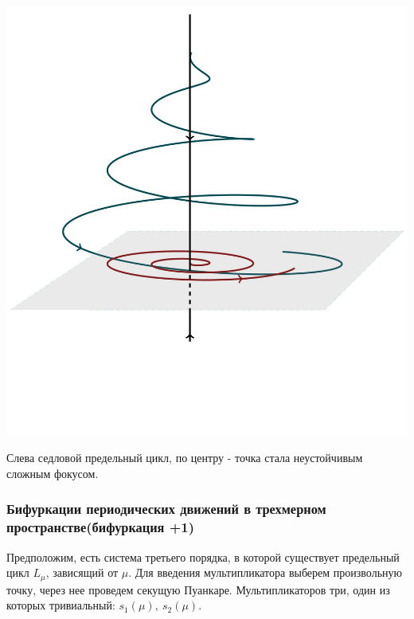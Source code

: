 \begin{center}
\begin{minipage}{0.3\linewidth}
        \vspace{-50pt}
        \label{fig:1}
    \end{minipage}
\hfill     
    \begin{minipage}{0.3\linewidth}
        \includegraphics[width=\linewidth]{fig/fig59.jpg} 
        \vspace{-50pt}
        \label{fig:1}
    \end{minipage}    
\end{center}

Слева седловой предельный цикл, по центру - точка стала неустойчивым сложным фокусом.

\subsubsection{Бифуркации периодических движений в трехмерном пространстве(бифуркация +1)}
Предположим, есть система третьего порядка, в которой существует предельный цикл $L_{\mu}$, зависящий от $\mu$. Для введения мультипликатора выберем произвольную точку, через нее проведем секущую Пуанкаре. Мультипликаторов три, один из которых тривиальный: $s_1(\mu),~s_2(\mu)$.

